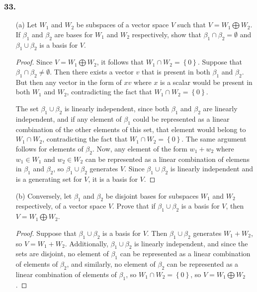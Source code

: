 \documentclass{article}
\begin{document}
\subsubsection*{33.}
\begin{enumerate}
	\item[(a)] Let $W_1$ and $W_2$ be subspaces of a vector space $V$ such that $V = W_1 \bigoplus W_2$. If $\beta_1$ and $\beta_2$ are bases for $W_1$ and $W_2$ respectively, show that $\beta_1 \cap \beta_2 = \emptyset$ and $\beta_1 \cup \beta_2$ is a basis for $V$.
	
	\begin{proof}
		Since $V = W_1 \bigoplus W_2$, it follows that $W_1 \cap W_2 = \left\{0\right\}$. Suppose that $\beta_1 \cap \beta_2 \ne \emptyset$. Then there exists a vector $v$ that is present in both $\beta_1$ and $\beta_2$. But then any vector in the form of $xv$ where $x$ is a scalar would be present in both $W_1$ and $W_2$, contradicting the fact that $W_1 \cap W_2 = \left\{0\right\}$.

		The set $\beta_1 \cup \beta_2$ is linearly independent, since both $\beta_1$ and $\beta_2$ are linearly independent, and if any element of $\beta_1$ could be represented as a linear combination of the other elements of this set, that element would belong to $W_1 \cap W_2$, contradicting the fact that $W_1 \cap W_2 = \left\{0\right\}$. The same argument follows for elements of $\beta_2$. Now, any element of the form $w_1 + w_2$ where $w_1\in W_1$ and $w_2\in W_2$ can be represented as a linear combination of elemens in $\beta_1$ and $\beta_2$, so $\beta_1 \cup \beta_2$ generates $V$. Since $\beta_1 \cup \beta_2$ is linearly independent and is a generating set for $V$, it is a basis for $V$.
	\end{proof}

	\item[(b)] Conversely, let $\beta_1$ and $\beta_2$ be disjoint bases for subspaces $W_1$ and $W_2$ respectively, of a vector space $V$. Prove that if $\beta_1 \cup \beta_2$ is a basis for $V$, then $V = W_1 \bigoplus W_2$.
	
	\begin{proof}
		Suppose that $\beta_1 \cup \beta_2$ is a basis for $V$. Then $\beta_1 \cup \beta_2$ generates $W_1 + W_2$, so $V = W_1 + W_2$. Additionally, $\beta_1 \cup \beta_2$ is linearly independent, and since the sets are disjoint, no element of $\beta_1$ can be represented as a linear combination of elements of $\beta_2$, and similarly, no element of $\beta_2$ can be represented as a linear combination of elements of $\beta_1$, so $W_1 \cap W_2 = \left\{0\right\}$, so $V = W_1 \bigoplus W_2$.
	\end{proof}
\end{enumerate}
\end{document}
